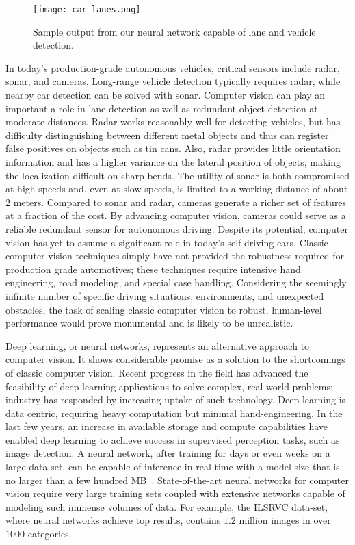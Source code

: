 \documentclass[journal]{IEEEtran}
\begin{document}
\begin{figure}[t]
  \centering
    \texttt{[image: car-lanes.png]}
 \caption{Sample output from our neural network capable of lane and vehicle detection.}
 \label{fig:car-lanes}
\end{figure}
In today's production-grade autonomous vehicles, critical sensors include radar, sonar, and cameras. Long-range vehicle detection typically requires radar, while nearby car detection can be solved with sonar. Computer vision can play an important a role in lane detection as well as redundant object detection at moderate distances. Radar works reasonably well for detecting vehicles, but has difficulty distinguishing between different metal objects and thus can register false positives on objects such as tin cans. Also, radar provides little orientation information and has a higher variance on the lateral position of objects, making the localization difficult on sharp bends. The utility of sonar is both compromised at high speeds and, even at slow speeds, is limited to a working distance of about $2$ meters. Compared to sonar and radar, cameras generate a richer set of features at a fraction of the cost. By advancing computer vision, cameras could serve as a reliable redundant sensor for autonomous driving. Despite its potential, computer vision has yet to assume a significant role in today's self-driving cars. Classic computer vision techniques simply have not provided the robustness required for production grade automotives; these techniques require intensive hand engineering, road modeling, and special case handling. Considering the seemingly infinite number of specific driving situations, environments, and unexpected obstacles, the task of scaling classic computer vision to robust, human-level performance would prove monumental and is likely to be unrealistic.

Deep learning, or neural networks, represents an alternative approach to computer vision. It shows considerable promise as a solution to the shortcomings of classic computer vision. Recent progress in the field has advanced the feasibility of deep learning applications to solve complex, real-world  problems; industry has responded by increasing uptake of such technology. Deep learning is data centric, requiring heavy computation but minimal hand-engineering. In the last few years, an increase in available storage and compute capabilities have enabled deep learning to achieve success in supervised perception tasks, such as image detection. A neural network, after training for days or even weeks on a large data set, can be capable of inference in real-time with a model size that is no larger than a few hundred MB~\cite{krizhevsky-2012}. State-of-the-art neural networks for computer vision require very large training sets coupled with extensive networks capable of modeling such immense volumes of data. For example, the ILSRVC data-set, where neural networks achieve top results, contains $1.2$ million images in over $1000$ categories. 
\end{document}
